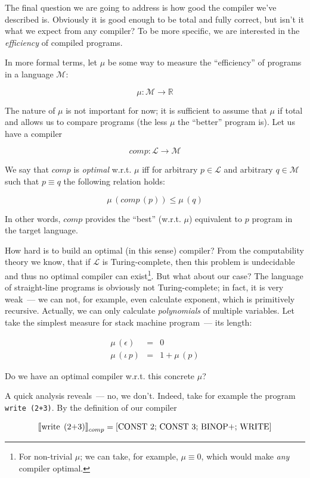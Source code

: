 The final question we are going to address is how good the compiler we've described is. Obviously it is good enough to be total and fully correct, but isn't it what
we expect from any compiler? To be more specific, we are interested in the \emph{efficiency} of compiled programs.

In more formal terms, let $\mu$ be some way to measure the ``efficiency'' of programs in a language $\mathscr{M}$:

\[
\mu : \mathscr{M}\to \mathbb{R}
\]

The nature of $\mu$ is not important for now; it is sufficient to assume that $\mu$ if total and allows us to compare programs (the less $\mu$ the ``better'' program is). Let us
have a compiler

\[
comp : \mathscr{L}\to\mathscr{M}
\]

We say that $comp$ is \emph{optimal} w.r.t. $\mu$ iff for arbitrary $p\in\mathscr{L}$ and arbitrary $q\in\mathscr{M}$ such that $p\equiv q$ the following relation holds:

\[
\mu\,(comp\,(p))\le\mu\,(q)
\]

In other words, $comp$ provides the ``best'' (w.r.t. $\mu$) equivalent to $p$ program in the target language.

How hard is to build an optimal (in this sense) compiler? From the computability theory we know, that if $\mathscr{L}$ is Turing-complete, then this problem is undecidable and
thus no optimal compiler can exist\footnote{For non-trivial $\mu$; we can take, for example, $\mu\equiv 0$, which would make \emph{any} compiler optimal.}.
But what about our case? The language of straight-line programs is obviously not Turing-complete; in fact, it is very weak~--- we can not,
for example, even calculate exponent, which is primitively recursive. Actually, we can only calculate \emph{polynomials} of multiple variables. Let take the simplest
measure for stack machine program~--- its length:

\[
\begin{array}{rcl}
  \mu\,(\epsilon)&=&0\\
  \mu\,(\iota\,p)&=&1+\mu\,(p)
\end{array}
\]

Do we have an optimal compiler w.r.t. this concrete $\mu$?

A quick analysis reveals~--- no, we don't. Indeed, take for example the program \lstinline|write (2+3)|. By the definition of our compiler

\[
\sembr{\llang{write (2+3)}}^\ph_{comp}=[\llang{CONST 2; CONST 3; BINOP+; WRITE}]
\]

